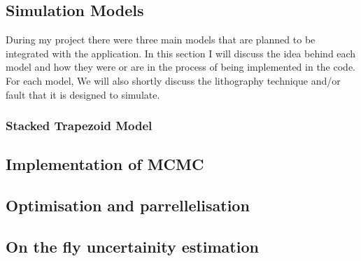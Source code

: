 \subsection{Simulation Models}

During my project there were three main models that are planned to be integrated with the application. 
In this section I will discuss the idea behind each model and how they were or are in the process of being implemented in the code.
For each model, We will also shortly discuss the lithography technique and/or fault that it is designed to simulate.

\subsubsection{Stacked Trapezoid Model}





\subsection{Implementation of MCMC}
\subsection{Optimisation and parrellelisation}
\subsection{On the fly uncertainity estimation}